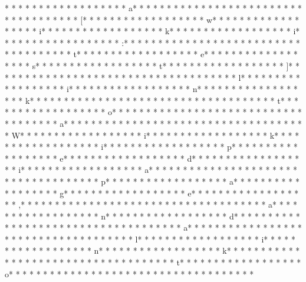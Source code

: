 * * *  * * *  * * *  *  * * *  *  * * *  * a* * *  * * *  * * *  *  * * *  *  * * *  *  * * *  * * *  * * *  *  * * *  *  * * *  * [* * *  * * *  * * *  *  * * *  *  * * *  * w* * *  * * *  * * *  *  * * *  *  * * *  * i* * *  * * *  * * *  *  * * *  *  * * *  * k* * *  * * *  * * *  *  * * *  *  * * *  * i* * *  * * *  * * *  *  * * *  *  * * *  * :* * *  * * *  * * *  *  * * *  *  * * *  *  * * *  * * *  * * *  *  * * *  *  * * *  * t* * *  * * *  * * *  *  * * *  *  * * *  * e* * *  * * *  * * *  *  * * *  *  * * *  * s* * *  * * *  * * *  *  * * *  *  * * *  * t* * *  * * *  * * *  *  * * *  *  * * *  * ]* * *  * * *  * * *  *  * * *  *  * * *  *  * * *  * * *  * * *  *  * * *  *  * * *  * l* * *  * * *  * * *  *  * * *  *  * * *  * i* * *  * * *  * * *  *  * * *  *  * * *  * n* * *  * * *  * * *  *  * * *  *  * * *  * k* * *  * * *  * * *  *  * * *  *  * * *  *  * * *  * * *  * * *  *  * * *  *  * * *  * t* * *  * * *  * * *  *  * * *  *  * * *  * o* * *  * * *  * * *  *  * * *  *  * * *  *  * * *  * * *  * * *  *  * * *  *  * * *  * a* * *  * * *  * * *  *  * * *  *  * * *  *  * * *  * * *  * * *  *  * * *  *  * * *  * W* * *  * * *  * * *  *  * * *  *  * * *  * i* * *  * * *  * * *  *  * * *  *  * * *  * k* * *  * * *  * * *  *  * * *  *  * * *  * i* * *  * * *  * * *  *  * * *  *  * * *  * p* * *  * * *  * * *  *  * * *  *  * * *  * e* * *  * * *  * * *  *  * * *  *  * * *  * d* * *  * * *  * * *  *  * * *  *  * * *  * i* * *  * * *  * * *  *  * * *  *  * * *  * a* * *  * * *  * * *  *  * * *  *  * * *  *  * * *  * * *  * * *  *  * * *  *  * * *  * p* * *  * * *  * * *  *  * * *  *  * * *  * a* * *  * * *  * * *  *  * * *  *  * * *  * g* * *  * * *  * * *  *  * * *  *  * * *  * e* * *  * * *  * * *  *  * * *  *  * * *  * ,* * *  * * *  * * *  *  * * *  *  * * *  *  * * *  * * *  * * *  *  * * *  *  * * *  * a* * *  * * *  * * *  *  * * *  *  * * *  * n* * *  * * *  * * *  *  * * *  *  * * *  * d* * *  * * *  * * *  *  * * *  *  * * *  *  * * *  * * *  * * *  *  * * *  *  * * *  * a* * *  * * *  * * *  *  * * *  *  * * *  *  * * *  * * *  * * *  *  * * *  *  * * *  * l* * *  * * *  * * *  *  * * *  *  * * *  * i* * *  * * *  * * *  *  * * *  *  * * *  * n* * *  * * *  * * *  *  * * *  *  * * *  * k* * *  * * *  * * *  *  * * *  *  * * *  *  * * *  * * *  * * *  *  * * *  *  * * *  * t* * *  * * *  * * *  *  * * *  *  * * *  * o* * *  * * *  * * *  *  * * *  *  * * *  *  * * *  * * *  * * *  *  * * *  *  * * *  * 
